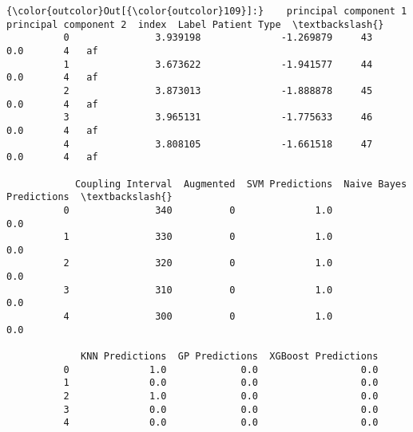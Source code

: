 \documentclass[11pt]{article}
\begin{document}
\begin{Verbatim}[commandchars=\\\{\}]
{\color{outcolor}Out[{\color{outcolor}109}]:}    principal component 1  principal component 2  index  Label Patient Type  \textbackslash{}
          0               3.939198              -1.269879     43    0.0       4   af   
          1               3.673622              -1.941577     44    0.0       4   af   
          2               3.873013              -1.888878     45    0.0       4   af   
          3               3.965131              -1.775633     46    0.0       4   af   
          4               3.808105              -1.661518     47    0.0       4   af   
          
            Coupling Interval  Augmented  SVM Predictions  Naive Bayes Predictions  \textbackslash{}
          0               340          0              1.0                      0.0   
          1               330          0              1.0                      0.0   
          2               320          0              1.0                      0.0   
          3               310          0              1.0                      0.0   
          4               300          0              1.0                      0.0   
          
             KNN Predictions  GP Predictions  XGBoost Predictions  
          0              1.0             0.0                  0.0  
          1              0.0             0.0                  0.0  
          2              1.0             0.0                  0.0  
          3              0.0             0.0                  0.0  
          4              0.0             0.0                  0.0  
\end{Verbatim}
            
\end{document}
